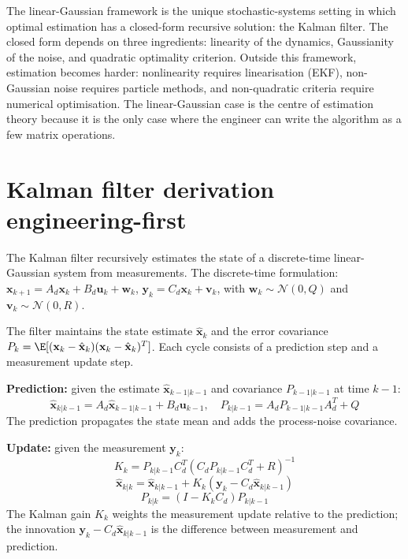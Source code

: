 \begin{archetype}
The linear-Gaussian framework is the unique stochastic-systems setting in which optimal estimation has a closed-form recursive solution: the Kalman filter. The closed form depends on three ingredients: linearity of the dynamics, Gaussianity of the noise, and quadratic optimality criterion. Outside this framework, estimation becomes harder: nonlinearity requires linearisation (EKF), non-Gaussian noise requires particle methods, and non-quadratic criteria require numerical optimisation. The linear-Gaussian case is the centre of estimation theory because it is the only case where the engineer can write the algorithm as a few matrix operations.
\end{archetype}

\section{Kalman filter derivation engineering-first}

The Kalman filter recursively estimates the state of a discrete-time linear-Gaussian system from measurements. The discrete-time formulation: $\mathbf{x}_{k+1} = A_d \mathbf{x}_k + B_d \mathbf{u}_k + \mathbf{w}_k$, $\mathbf{y}_k = C_d \mathbf{x}_k + \mathbf{v}_k$, with $\mathbf{w}_k \sim \mathcal{N}(0, Q)$ and $\mathbf{v}_k \sim \mathcal{N}(0, R)$.

The filter maintains the state estimate $\hat{\mathbf{x}}_k$ and the error covariance $P_k = \E[(\mathbf{x}_k - \hat{\mathbf{x}}_k)(\mathbf{x}_k - \hat{\mathbf{x}}_k)^T]$. Each cycle consists of a prediction step and a measurement update step.

\textbf{Prediction:} given the estimate $\hat{\mathbf{x}}_{k-1|k-1}$ and covariance $P_{k-1|k-1}$ at time $k-1$:
$$\hat{\mathbf{x}}_{k|k-1} = A_d \hat{\mathbf{x}}_{k-1|k-1} + B_d \mathbf{u}_{k-1}, \quad P_{k|k-1} = A_d P_{k-1|k-1} A_d^T + Q$$
The prediction propagates the state mean and adds the process-noise covariance.

\textbf{Update:} given the measurement $\mathbf{y}_k$:
$$K_k = P_{k|k-1} C_d^T (C_d P_{k|k-1} C_d^T + R)^{-1}$$
$$\hat{\mathbf{x}}_{k|k} = \hat{\mathbf{x}}_{k|k-1} + K_k (\mathbf{y}_k - C_d \hat{\mathbf{x}}_{k|k-1})$$
$$P_{k|k} = (I - K_k C_d) P_{k|k-1}$$
The Kalman gain $K_k$ weights the measurement update relative to the prediction; the innovation $\mathbf{y}_k - C_d \hat{\mathbf{x}}_{k|k-1}$ is the difference between measurement and prediction.


